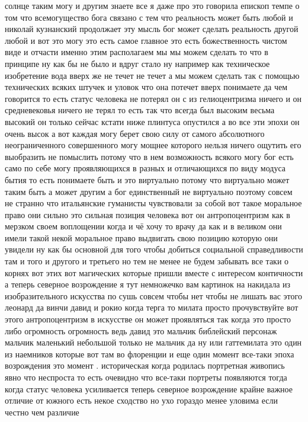 солнце таким могу и другим знаете все я даже про это говорила епископ темпе о
том что всемогущество бога связано с тем что реальность может быть любой и
николай кузнанский продолжает эту мысль бог может сделать реальность другой
любой и вот это могу это есть самое главное это есть божественность чистом виде
и отчасти именно этим располагаем мы мы можем сделать то что в принципе ну как
бы не было и вдруг стало ну например как техническое изобретение вода вверх же
не течет не течет а мы можем сделать так с помощью технических всяких штучек и
уловок что она потечет вверх понимаете да чем говорится то есть статус человека
не потерял он с из гелиоцентризма ничего и он средневековья ничего не терял то
есть так что всегда был высоким весьма высокий он только сейчас кстати ниже
плинтуса опустился а во все эти эпохи он очень высок а вот каждая могу берет
свою силу от самого абсолютного неограниченного совершенного могу мощнее
которого нельзя ничего ощутить его выобразить не помыслить потому что в нем
возможность всякого могу бог есть само по себе могу проявляющихся в разных и
отличающихся по виду модуса бытия то есть понимаете быть и это виртуально потому
что виртуально может таким быть а может другим а бог единственный не виртуально
поэтому совсем не странно что итальянские гуманисты чувствовали за собой вот
такое моральное право они сильно это сильная позиция человека вот он
антропоцентризм как в мерзком своем воплощении когда и чё хочу то врачу да как и
в великом они имели такой некой моральное право выдвигать свою позицию которую
они увидели ну как бы основной для того чтобы добиться социальной справедливости
там и того и другого и третьего но тем не менее не будем забывать все таки о
корнях вот этих вот магических которые пришли вместе с интересом контичности а
теперь северное возрождение я тут немножечко вам картинок на накидала из
изобразительного искусства по сушь совсем чтобы нет чтобы не лишать вас этого
леонард да винчи давид и рокио когда терга то милата просто прочувствуйте вот
этого антропоцентризм в искусстве он может проявляться так когда это просто либо
огромность огромность ведь давид это мальчик библейский персонаж мальчик
маленький небольшой только не мальчик да ну или гаттемилата это один из
наемников которые вот там во флоренции и еще один момент все-таки эпоха
возрождения это момент . историческая когда родилась портретная живопись явно
что неспроста то есть очевидно что все-таки портреты появляются тогда когда
статус человека усиливается теперь северное возрождение крайне важное отличие от
южного есть некое сходство но ухо гораздо менее уловима если честно чем различие
